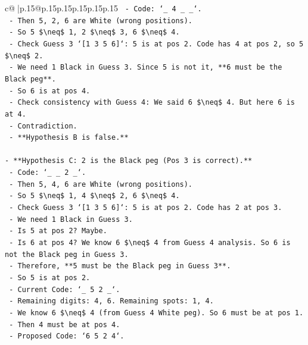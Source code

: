 \documentclass{article}
\begin{document}
{\begin{supertabular}{c@{$\;$}|p{.15\linewidth}@{}p{.15\linewidth}p{.15\linewidth}p{.15\linewidth}p{.15\linewidth}p{.15\linewidth}}
{{{\texttt{    {-} Code: `\_ 4 \_ \_`.} \\
\texttt{    {-} Then 5, 2, 6 are White (wrong positions).} \\
\texttt{    {-} So 5 \$\textbackslash{}neq\$ 1, 2 \$\textbackslash{}neq\$ 3, 6 \$\textbackslash{}neq\$ 4.} \\
\texttt{    {-} Check Guess 3 `{[}1 3 5 6{]}`: 5 is at pos 2. Code has 4 at pos 2, so 5 \$\textbackslash{}neq\$ 2.} \\
\texttt{    {-} We need 1 Black in Guess 3. Since 5 is not it, **6 must be the Black peg**.} \\
\texttt{    {-} So 6 is at pos 4.} \\
\texttt{    {-} Check consistency with Guess 4: We said 6 \$\textbackslash{}neq\$ 4. But here 6 is at 4.} \\
\texttt{    {-} Contradiction.} \\
\texttt{    {-} **Hypothesis B is false.**} \\
\\ 
\texttt{{-} **Hypothesis C: 2 is the Black peg (Pos 3 is correct).**} \\
\texttt{    {-} Code: `\_ \_ 2 \_`.} \\
\texttt{    {-} Then 5, 4, 6 are White (wrong positions).} \\
\texttt{    {-} So 5 \$\textbackslash{}neq\$ 1, 4 \$\textbackslash{}neq\$ 2, 6 \$\textbackslash{}neq\$ 4.} \\
\texttt{    {-} Check Guess 3 `{[}1 3 5 6{]}`: 5 is at pos 2. Code has 2 at pos 3.} \\
\texttt{    {-} We need 1 Black in Guess 3.} \\
\texttt{    {-} Is 5 at pos 2? Maybe.} \\
\texttt{    {-} Is 6 at pos 4? We know 6 \$\textbackslash{}neq\$ 4 from Guess 4 analysis. So 6 is not the Black peg in Guess 3.} \\
\texttt{    {-} Therefore, **5 must be the Black peg in Guess 3**.} \\
\texttt{    {-} So 5 is at pos 2.} \\
\texttt{    {-} Current Code: `\_ 5 2 \_`.} \\
\texttt{    {-} Remaining digits: 4, 6. Remaining spots: 1, 4.} \\
\texttt{    {-} We know 6 \$\textbackslash{}neq\$ 4 (from Guess 4 White peg). So 6 must be at pos 1.} \\
\texttt{    {-} Then 4 must be at pos 4.} \\
\texttt{    {-} Proposed Code: `6 5 2 4`.} \\
}}}
\end{supertabular}}
\end{document}

